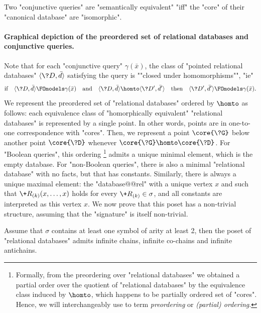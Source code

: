 \begin{corollary}
	Two "conjunctive queries" are "semantically equivalent" "iff"
	the "core" of their "canonical database" are "isomorphic".
\end{corollary}

\paragraph*{Graphical depiction of the preordered set of relational databases and conjunctive queries.}
Note that for each "conjunctive query" $\gamma(\bar x)$, the class of
"pointed relational databases" $\tup{\?D, \bar d}$ satisfying the query
is \AP""closed under homomorphisms"", "ie"
\[
	\text{if}\quad \tup{\?D, \bar d} \FOmodels \gamma(\bar x)
	\quad\text{and}\quad \tup{\?D, \bar d} \homto \tup{\?D', \bar d'}
	\quad\text{then}\quad \tup{\?D', \bar d'} \FOmodels \gamma(\bar x).
\]
We represent the preordered set of "relational databases" ordered by $\homto$ as follows:
each equivalence class of "homorphically equivalent" "relational databases" is
represented by a single point. In other words, points are in one-to-one correspondence
with "cores". Then, we represent a point $\core{\?G}$ below another point $\core{\?D}$
whenever $\core{\?G} \homto \core{\?D}$.
For "Boolean queries", this ordering%
\footnote{Formally, from the preordering over "relational databases" we obtained a partial
order over the quotient of "relational databases" by the equivalence class induced by $\homto$,
which happens to be partially ordered set of "cores". Hence, we will interchangeably
use to term \emph{preordering} or \emph{(partial) ordering}.}
admits a unique minimal element, which is the empty database.
For "non-Boolean queries", there is also a minimal "relational database" with
no facts, but that has constants.%
Similarly, there is always a unique maximal element: the "database@@rel" with
a unique vertex $x$ and such that $\+R_{(k)}(x,\dotsc,x)$ holds for
every $\+R_{(k)} \in \sigma$, and all constants are interpreted as this vertex $x$.
We now prove that this poset has a non-trivial structure, assuming that the "signature"
is itself non-trivial.

\begin{proposition}
	\AP\label{prop:poset-reldb}
	Assume that $\sigma$ contains at least one symbol of arity at least 2,
	then the poset of "relational databases"
	admits infinite chains, infinite co-chains and infinite antichains.
\end{proposition}

